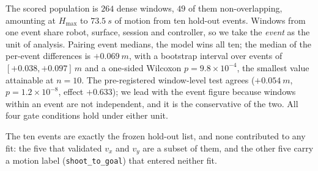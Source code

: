 The scored population is $264$ dense windows, $49$ of them non-overlapping,
amounting at $H_{\max}$ to $\SI{73.5}{s}$ of motion from ten hold-out events.
Windows from one event share robot, surface, session and controller, so we take
the \emph{event} as the unit of analysis. Pairing event medians, the model wins
all ten; the median of the per-event differences is $+\SI{0.069}{m}$, with a
bootstrap interval over events of $[+0.038,+0.097]\,\si{m}$ and a one-sided
Wilcoxon $p = 9.8\times10^{-4}$, the smallest value attainable at $n=10$. The
pre-registered window-level test agrees ($+\SI{0.054}{m}$,
$p = 1.2\times10^{-8}$, effect $+0.633$); we lead with the event figure because
windows within an event are not independent, and it is the conservative of the
two. All four gate conditions hold under either unit.

The ten events are exactly the frozen hold-out list, and none contributed to
any fit: the five that validated $v_x$ and $v_y$ are a subset of them, and the
other five carry a motion label (\texttt{shoot\_to\_goal}) that entered neither
fit.


